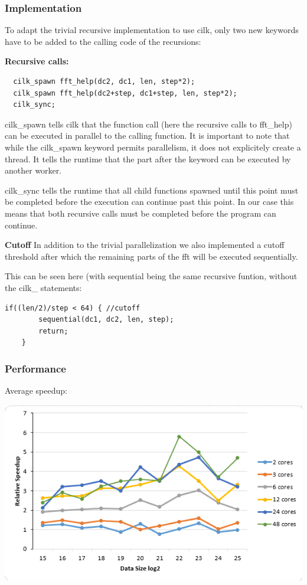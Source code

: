 \subsubsection{Implementation}
	To adapt the trivial recursive implementation to use cilk, only two new keywords have to be added to the calling code of the recursions:

\textbf{Recursive calls:}
\begin{lstlisting}
  cilk_spawn fft_help(dc2, dc1, len, step*2);
  cilk_spawn fft_help(dc2+step, dc1+step, len, step*2);
  cilk_sync;
\end{lstlisting}

cilk\_spawn tells cilk that the function call (here the recursive calls to fft_help) can be executed in parallel to the calling function. It is important to note that while the cilk_spawn keyword permits parallelism, it does not explicitely create a thread. It tells the runtime that the part after the keyword can be executed by another worker. 

cilk\_sync  tells the runtime that all child functions spawned until this point must be completed before the execution can continue past this point. In our case this means that both recursive calls must be completed before the program can continue. 

\textbf{Cutoff}
In addition to the trivial parallelization we also implemented a cutoff threshold after which the remaining parts of the fft will be executed sequentially. 

This can be seen here (with sequential being the same recursive funtion, without the cilk\_ statements: 
\begin{lstlisting}
if((len/2)/step < 64) { //cutoff
		sequential(dc1, dc2, len, step);
		return;
	}
\end{lstlisting}

\subsubsection{Performance}

Average speedup:

\includegraphics[width=\textwidth]{cilk_rec_avg.png}

